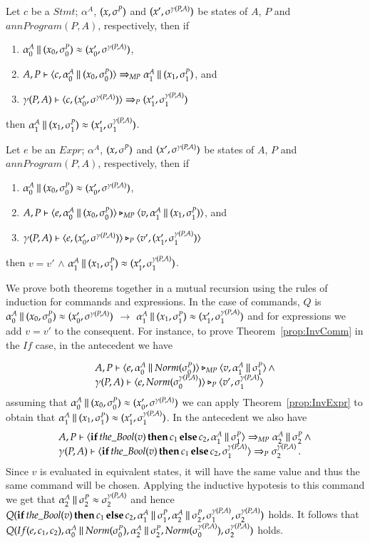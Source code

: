 \documentclass[a4paper,10pt]{article}
\begin{document}
\begin{theorem}\label{prop:InvComm}
Let $c$ be a $Stmt$; $\alpha^A$, $(x, \sP)$ and $(x', \sAP)$ be states of $A$, $P$ and $annProgram(P, A)$,
respectively, then if
\begin{enumerate}
  \item $\sixMP \approx (x'_0, \sAP)$,
  \item $\stmp{c, \sixMP}{\soxMP}$, and
  \item $\stap{c, (x'_0, \sAP)}{(x'_1, \soAP)}$
\end{enumerate}
then $\soxMP \approx (x'_1, \soAP)$.
\end{theorem}

\begin{theorem}\label{prop:InvExpr}
Let $e$ be an $Expr$; $\alpha^A$, $(x, \sP)$ and $(x', \sAP)$ be states of $A$,
$P$ and $annProgram(P, A)$, respectively, then if
\begin{enumerate}
  \item $\sixMP \approx (x'_0, \sAP)$,
  \item $\etmp{e, \sixMP}{v, \soxMP}$, and
  \item $\etap{e, (x'_0, \sAP)}{v', (x'_1, \soAP)}$
\end{enumerate}
then $v = v'$ $\wedge$ $\soxMP \approx (x'_1, \soAP)$.
\end{theorem}

We prove both theorems together in a mutual recursion using the rules of induction for commands and
expressions. In the case of commands, $Q$ is $\sixMP \approx (x'_0, \sAP)$ $\longrightarrow$ $\soxMP \approx
(x'_1, \soAP)$ and for expressions we add $v = v'$ to the consequent.
For instance, to prove Theorem~\ref{prop:InvComm} in the $If$ case, in the antecedent we have

\[
\begin{array}{l}
\etmp{e, \sinMP }{v, \soMP} \,\wedge\\
\etap{e, Norm(\siAP)}{v', \soAP}\\
\end{array}
\]
assuming that $\sixMP \approx (x'_0, \sAP)$ we can apply Theorem~\ref{prop:InvExpr} to obtain that $\soxMP
\approx (x'_1, \soAP)$. In the antecedent we also have
\[
\begin{array}{l}
\stmp{\pif{the\_Bool(v)}{c_1}{c_2}, \soMP}{\stMP} \,\wedge\\
\stap{\pif{the\_Bool(v)}{c_1}{c_2}, \soAP}{\stAP} \,.\\
\end{array}
\]
Since $v$ is evaluated in equivalent states, it will have the same value and thus the same command will be
chosen. Applying the inductive hypotesis to this command we get that $\stMP \approx \stAP$ and hence
$Q(\pif{the\_Bool(v)}{c_1}{c_2}, \soMP, \stMP, \soAP, \stAP)$ holds. It follows that $Q(If(e, c_1, c_2),
\sinMP, \stMP, \sinAP, \stAP)$ holds.
\end{document}
